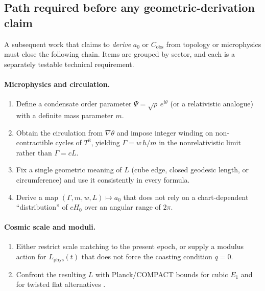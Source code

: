 \documentclass[aps,prd,reprint,superscriptaddress,nofootinbib,floatfix,showkeys]{revtex4-2}
\newcommand{\Tthree}{T^{3}}
\newcommand{\Cobs}{C_{\mathrm{obs}}}
\newcommand{\azero}{a_{0}}
\newcommand{\Hzero}{H_{0}}
\begin{document}
\subsection{Path required before any geometric-derivation claim}

A subsequent work that claims to \emph{derive} \(\azero\) or \(\Cobs\) from
topology or microphysics must close the following chain.  Items are grouped
by sector, and each is a separately testable technical requirement.

\paragraph{Microphysics and circulation.}
\begin{enumerate}
\item[(M1)] Define a condensate order parameter
  \(\Psi=\sqrt{\rho}\,e^{i\theta}\)
  (or a relativistic analogue) with a definite mass parameter \(m\).
\item[(M2)] Obtain the circulation from \(\nabla\theta\) and impose integer
  winding on non-contractible cycles of \(\Tthree\), yielding
  \(\Gamma=w\,h/m\) in the nonrelativistic limit rather than \(\Gamma=cL\).
\item[(M3)] Fix a single geometric meaning of \(L\)
  (cube edge, closed geodesic length, or circumference) and use it
  consistently in every formula.
\item[(M4)] Derive a map
  \((\Gamma,m,w,L)\mapsto\azero\)
  that does not rely on a chart-dependent ``distribution'' of \(c\Hzero\) over
  an angular range of \(2\pi\).
\end{enumerate}

\paragraph{Cosmic scale and moduli.}
\begin{enumerate}
\item[(S1)] Either restrict scale matching to the present epoch, or supply a
  modulus action for \(L_{\mathrm{phys}}(t)\) that does not force the
  coasting condition \(q=0\).
\item[(S2)] Confront the resulting \(L\) with Planck/COMPACT bounds for cubic
  \(E_1\) and for twisted flat alternatives \cite{planck_topology,compact_promise}.
\end{enumerate}
\end{document}
